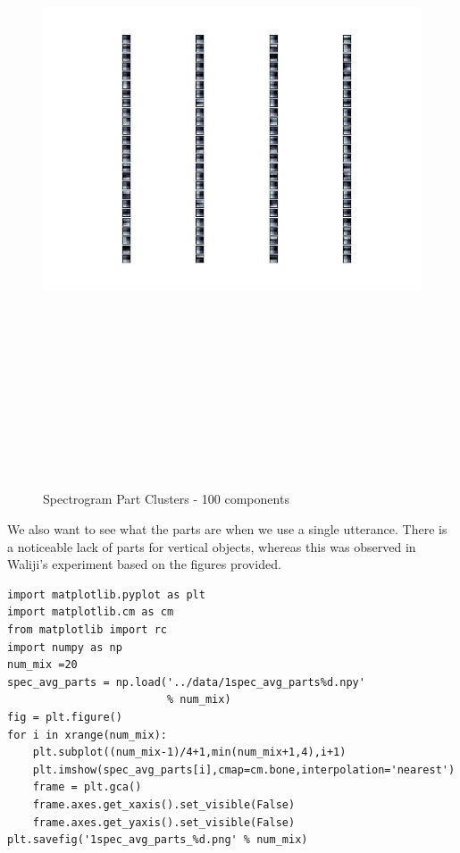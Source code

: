\documentclass[11pt]{article}
\begin{document}
\begin{figure}[htb]
\centering
\includegraphics[height=20cm]{./spec_avg_parts_100.png}
\caption{\label{fig:spec_avg_parts_100}Spectrogram Part Clusters - 100 components}
\end{figure}


We also want to see what the parts are when we use a single utterance.
There is a noticeable lack of parts for vertical objects, whereas this
was observed in Waliji's experiment based on the figures provided.


\begin{verbatim}
import matplotlib.pyplot as plt
import matplotlib.cm as cm
from matplotlib import rc
import numpy as np
num_mix =20
spec_avg_parts = np.load('../data/1spec_avg_parts%d.npy' 
                         % num_mix)
fig = plt.figure()
for i in xrange(num_mix):
    plt.subplot((num_mix-1)/4+1,min(num_mix+1,4),i+1)
    plt.imshow(spec_avg_parts[i],cmap=cm.bone,interpolation='nearest')
    frame = plt.gca()
    frame.axes.get_xaxis().set_visible(False)
    frame.axes.get_yaxis().set_visible(False)
plt.savefig('1spec_avg_parts_%d.png' % num_mix)
\end{verbatim}
\end{document}
